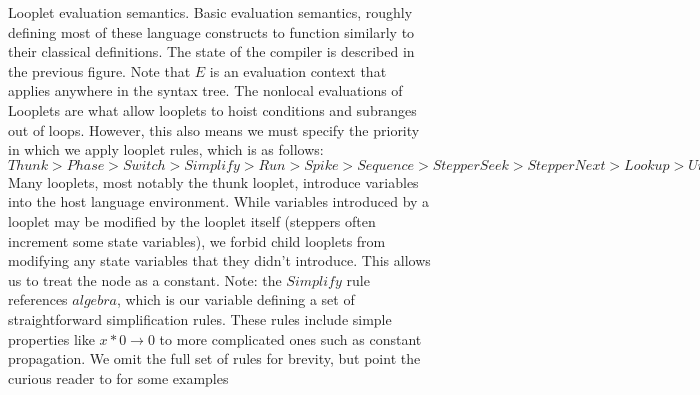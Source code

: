 \begin{figure}
    \caption{Looplet evaluation semantics. 
    Basic evaluation semantics, roughly defining most of these language
    constructs to function similarly to their classical definitions.
    The state of the compiler is described in the previous figure.
     Note that $E$ is an evaluation context that applies anywhere in
    the syntax tree. 
    The nonlocal evaluations of Looplets are what allow looplets to
    hoist conditions and subranges out of loops.
    However, this also means we must specify
    the priority in which we apply looplet rules, which is as follows:
    $Thunk > Phase > Switch > Simplify > Run > Spike > Sequence > StepperSeek > StepperNext > Lookup > Unfurl$
    Many looplets, most notably the thunk looplet, introduce variables into the
    host language environment. 
    While variables introduced by a looplet may be
    modified by the looplet itself (steppers often increment some state
    variables), we forbid child looplets from modifying any state variables that
    they didn't introduce. 
    This allows us to treat the \finchvalue node as a
    constant.
    Note: the $Simplify$ rule references $algebra$, which is our variable
    defining a set of straightforward simplification rules. 
    These rules include
    simple properties like $x * 0 \rightarrow 0$ to more complicated ones such
    as constant propagation. 
    We omit the full set of rules for brevity, but
    point the curious reader to \cite[Figure 5]{ahrens_looplets_2023} for some examples}
    \label{fig:semantics_looplets}
\end{figure}


